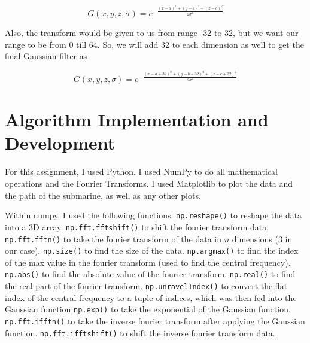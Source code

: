 \documentclass[11pt]{amsart}
\begin{document}
\[G(x, y, z, \sigma) = e^{-\frac{(x - a)^2 + (y - b)^2 + (z - c)^2}{2\sigma^2}}\]

Also, the transform would be given to us from range -32 to 32, but we want our range to be from 0 till 64.
So, we will add 32 to each dimension as well to get the final Gaussian filter as 

\[G(x, y, z, \sigma) = e^{-\frac{(x - a + 32)^2 + (y - b + 32)^2 + (z - c + 32)^2}{2\sigma^2}}\]


\section{Algorithm Implementation and Development}\label{sec:algorithms}

For this assignment, I used Python. I used NumPy to do all mathematical operations and the Fourier Transforms. 
I used Matplotlib to plot the data and the path of the submarine, as well as any other plots. 

Within numpy, I used the following functions:
\subitem \texttt{np.reshape()} to reshape the data into a 3D array.
\subitem \texttt{np.fft.fftshift()} to shift the fourier transform data. 
\subitem \texttt{np.fft.fftn()} to take the fourier transform of the data in $n$ dimensions (3 in our case).
\subitem \texttt{np.size()} to find the size of the data.
\subitem \texttt{np.argmax()} to find the index of the max value in the fourier transform (used to find the central frequency).
\subitem \texttt{np.abs()} to find the absolute value of the fourier transform.
\subitem \texttt{np.real()} to find the real part of the fourier transform.
\subitem \texttt{np.unravelIndex()} to convert the flat index of the central frequency to a tuple of indices,
which was then fed into the Gaussian function 
\subitem \texttt{np.exp()} to take the exponential of the Gaussian function.
\subitem \texttt{np.fft.ifftn()} to take the inverse fourier transform after applying the Gaussian function.
\subitem \texttt{np.fft.ifftshift()} to shift the inverse fourier transform data.
\end{document}
